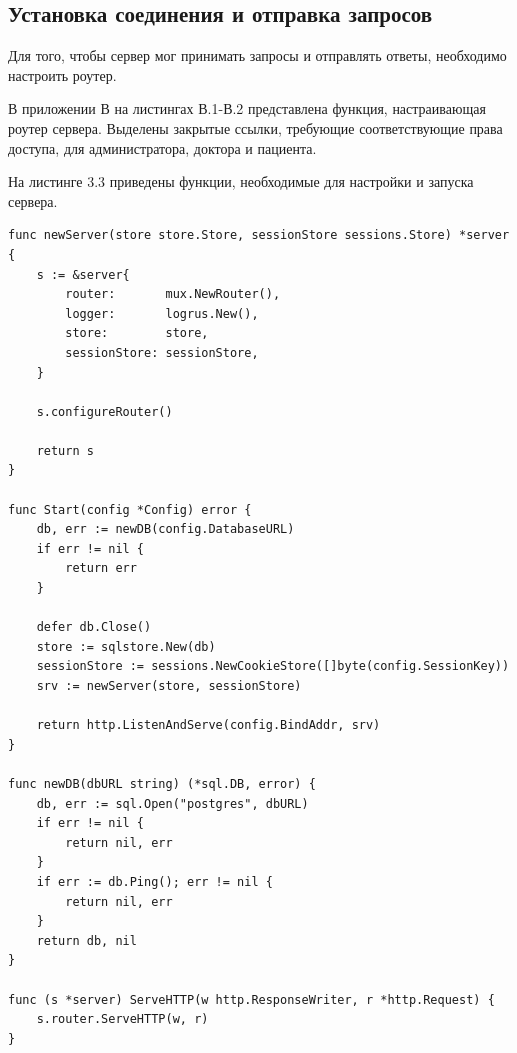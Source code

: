 \subsection*{Установка соединения и отправка запросов}

Для того, чтобы сервер мог принимать запросы и отправлять ответы, необходимо настроить роутер.

В приложении В на листингах В.1-В.2 представлена функция, настраивающая роутер сервера. Выделены закрытые ссылки, требующие соответствующие права доступа, для администратора, доктора и пациента.

\clearpage

На листинге 3.3 приведены функции, необходимые для настройки и запуска сервера.

\begin{lstlisting}[caption={Настройка и запуск сервера}]
func newServer(store store.Store, sessionStore sessions.Store) *server {
	s := &server{
		router:       mux.NewRouter(),
		logger:       logrus.New(),
		store:        store,
		sessionStore: sessionStore,
	}
	
	s.configureRouter()
	
	return s
}

func Start(config *Config) error {
	db, err := newDB(config.DatabaseURL)
	if err != nil {
		return err
	}
	
	defer db.Close()
	store := sqlstore.New(db)
	sessionStore := sessions.NewCookieStore([]byte(config.SessionKey))
	srv := newServer(store, sessionStore)
	
	return http.ListenAndServe(config.BindAddr, srv)
}	
	
func newDB(dbURL string) (*sql.DB, error) {
	db, err := sql.Open("postgres", dbURL)
	if err != nil {
		return nil, err
	}
	if err := db.Ping(); err != nil {
		return nil, err
	}
	return db, nil
}

func (s *server) ServeHTTP(w http.ResponseWriter, r *http.Request) {
	s.router.ServeHTTP(w, r)
}
\end{lstlisting}

\clearpage




